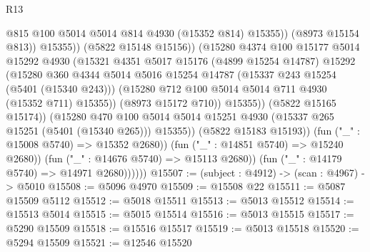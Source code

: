 \begin{lexlean}{R13}
\begin{coremodule}
                                        @815
                                        @100
                                        @5014
                                        @5014
                                        @814
                                        @4930
                                        (@15352 @814)
                                        @15355))
                                    (@8973 @15154 @813))
                                  @15355))
                              (@5822 @15148 @15156))
                            (@15280
                              @4374
                              @100
                              @15177
                              @5014
                              @15292
                              @4930
                              (@15321
                                @4351
                                @5017
                                @15176
                                (@4899 @15254 @14787)
                                @15292
                                (@15280
                                  @360
                                  @4344
                                  @5014
                                  @5016
                                  @15254
                                  @14787
                                  (@15337 @243 @15254 (@5401 (@15340 @243)))
                                  (@15280 @712 @100 @5014 @5014 @711 @4930 (@15352 @711) @15355))
                                (@8973 @15172 @710))
                              @15355))
                          (@5822 @15165 @15174))
                        (@15280
                          @470
                          @100
                          @5014
                          @5014
                          @15251
                          @4930
                          (@15337 @265 @15251 (@5401 (@15340 @265)))
                          @15355))
                      (@5822 @15183 @15193))
                    (fun ("_" : @15008 @5740) => @15352 @2680))
                  (fun ("_" : @14851 @5740) => @15240 @2680))
                (fun ("_" : @14676 @5740) => @15113 @2680))
              (fun ("_" : @14179 @5740) => @14971 @2680))))))
@15507 := (subject : @4912) -> (scan : @4967) -> @5010
@15508 := @5096 @4970
@15509 := @15508 @22
@15511 := @5087 @15509 @5112
@15512 := @5018 @15511
@15513 := @5013 @15512
@15514 := @15513 @5014
@15515 := @5015 @15514
@15516 := @5013 @15515
@15517 := @5290 @15509
@15518 := @15516 @15517
@15519 := @5013 @15518
@15520 := @5294 @15509
@15521 := @12546 @15520

\end{coremodule}
\end{lexlean}
